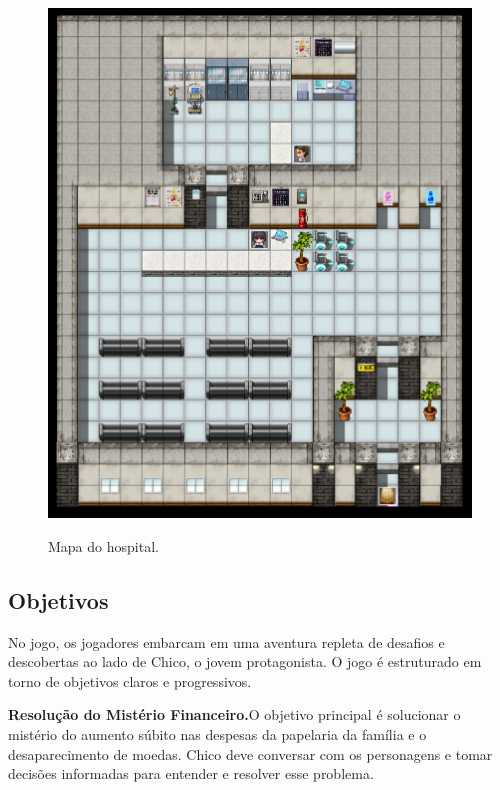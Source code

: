 \begin{figure}[!htbp]
	\centering
	\caption{Mapa do hospital.}
	\includegraphics[scale=0.4]{Textuais/Pictures/Hospital.png}
	\label{fig:hospital}
\end{figure}

\newpage

\subsection{Objetivos}

No jogo, os jogadores embarcam em uma aventura repleta de desafios e descobertas ao lado de Chico, o jovem protagonista. O jogo é estruturado em torno de objetivos claros e progressivos.

\medskip\noindent \textbf{Resolução do Mistério Financeiro.}\quad O objetivo principal é solucionar o mistério do aumento súbito nas despesas da papelaria da família e o desaparecimento de moedas. Chico deve conversar com os personagens e tomar decisões informadas para entender e resolver esse problema.

